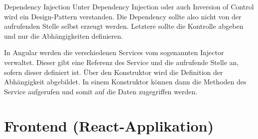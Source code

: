 Dependency Injection
Unter Dependency Injection oder auch Inversion of Control wird ein Design-Pattern verstanden. Die Dependency sollte also nicht von der aufrufenden Stelle selbst erzeugt werden. Letztere sollte die Kontrolle abgeben und nur die Abhängigkeiten definieren. 

In Angular werden die verschiedenen Services vom sogenannten Injector verwaltet. Dieser gibt eine Referenz des Service und die aufrufende Stelle an, sofern dieser definiert ist. Über den Konstruktor wird die Definition der Abhängigkeit abgebildet. In einem Konstruktor können dann die Methoden des Service aufgerufen und somit auf die Daten zugegriffen werden.
\cite{AngularService}

\section{Frontend (React-Applikation)}
